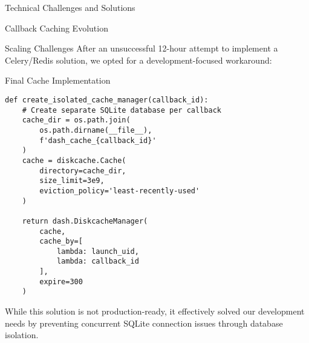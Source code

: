 \begin{section}{Technical Challenges and Solutions}
\begin{subsection}{Callback Caching Evolution}
\begin{subsubsection}{Scaling Challenges}
			After an unsuccessful 12-hour attempt to implement a Celery/Redis solution, we opted for a development-focused workaround:

			\begin{listing}[H]
				\caption{Final Cache Implementation}
				\begin{verbatim}
def create_isolated_cache_manager(callback_id):
    # Create separate SQLite database per callback
    cache_dir = os.path.join(
        os.path.dirname(__file__),
        f'dash_cache_{callback_id}'
    )
    cache = diskcache.Cache(
        directory=cache_dir,
        size_limit=3e9,
        eviction_policy='least-recently-used'
    )

    return dash.DiskcacheManager(
        cache,
        cache_by=[
            lambda: launch_uid,
            lambda: callback_id
        ],
        expire=300
    )
				\end{verbatim}
				\label{listing:dashboard-implementation-cache-final}
			\end{listing}

			While this solution is not production-ready, it effectively solved our development needs by preventing concurrent SQLite connection issues through database isolation.

		\end{subsubsection}

	\end{subsection}
\end{section}

